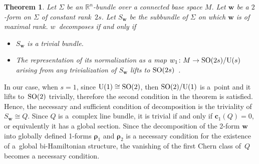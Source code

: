 \documentclass[10pt,a4paper]{amsart}
\numberwithin{equation}{section}
\newtheorem{Theorem}{Theorem}[section]
\begin{document}
\begin{Theorem}\label{theorem2} Let $\Sigma $ be an $\mathbb{R}^{n}$-bundle over a connected base space $M$. Let $\boldsymbol{w}$ be a $2$-form on $\Sigma $ of constant rank~$2s$. Let $S_{\boldsymbol{w}}$ be the subbundle of $\Sigma $ on which $\boldsymbol{w}$ is of maximal rank. $w$~decomposes if and only if
\begin{itemize}\itemsep=0pt
\item[$i)$] $S_{\boldsymbol{w}}$ is a trivial bundle.

\item[$ii)$] The representation of its normalization as a map $w_{1}\colon M\rightarrow {\rm SO}(2s)/{\rm U}(s)$ arising from any trivialization of $S_{\boldsymbol{w}}$ lifts to ${\rm SO}(2s)$~{\rm \cite{Dibag}}.
\end{itemize}
\end{Theorem}

In our case, when $s=1$, since ${\rm U}(1)\cong {\rm SO}(2)$, then ${\rm SO}(2)/{\rm U}(1)$ is a~point and it lifts to~${\rm SO}(2)$ trivially, therefore the second condition in the theorem is satisf\/ied. Hence, the necessary and suf\/f\/icient condition of decomposition is the triviality of $S_{\boldsymbol{w}}\cong Q$. Since $Q$ is a~complex line bundle, it is trivial if and only if $\boldsymbol{c}_{1}(Q)=0$, or equivalently it has a global section. Since the decomposition of the 2-form $\boldsymbol{w}$ into globally def\/ined 1-forms $\boldsymbol{\rho }_{1}$ and $\boldsymbol{\rho }_{2}$ is a necessary condition for the existence of a~global bi-Hamiltonian structure, the vanishing of the f\/irst Chern class of~$Q$ becomes a necessary condition.
\end{document}
